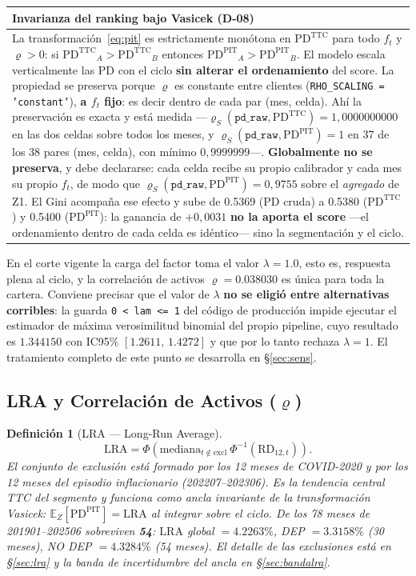 \documentclass[12pt, a4paper]{article}
\newcommand{\PDTTC}{\ensuremath{\mathrm{PD}^{\mathrm{TTC}}}}
\newcommand{\PDPIT}{\ensuremath{\mathrm{PD}^{\mathrm{PIT}}}}
\newcommand{\RD}{\ensuremath{\mathrm{RD}}}
\newcommand{\LRA}{\ensuremath{\mathrm{LRA}}}
\renewcommand{\rho}{\ensuremath{\varrho}}
\newcommand{\ft}{\ensuremath{f_t}}
\newtheorem{definicion}{Definición}[section]
\newenvironment{recuadro}[1]
{\begin{center}\begin{tabular}{|p{0.92\textwidth}|}
\hline
\rowcolor{grissuave}
\textbf{#1} \\ \hline
}
{\\ \hline \end{tabular}\end{center}}
\begin{document}
\begin{recuadro}{Invarianza del ranking bajo Vasicek (D-08)}
La transformación~\eqref{eq:pit} es estrictamente monótona en $\PDTTC$ para todo $\ft$ y
$\rho>0$: si $\PDTTC_A>\PDTTC_B$ entonces $\PDPIT_A>\PDPIT_B$. El modelo escala verticalmente
las PD con el ciclo \textbf{sin alterar el ordenamiento} del score. La propiedad se preserva
porque $\rho$ es constante entre clientes (\texttt{RHO\_SCALING = 'constant'}), \textbf{a $\ft$
fijo}: es decir dentro de cada par (mes, celda). Ahí la preservación es exacta y está medida
---$\rho_S(\texttt{pd\_raw},\PDTTC)=1{,}0000000000$ en las dos celdas sobre todos los meses, y
$\rho_S(\texttt{pd\_raw},\PDPIT)=1$ en 37 de los 38 pares (mes, celda), con mínimo $0{,}9999999$---.
\textbf{Globalmente no se preserva}, y debe declararse: cada celda recibe su propio calibrador y
cada mes su propio $\ft$, de modo que $\rho_S(\texttt{pd\_raw},\PDPIT)=0{,}9755$ sobre el
\emph{agregado} de Z1. El Gini acompaña ese efecto y sube de 0.5369 (PD cruda) a 0.5380 (\PDTTC) y
0.5400 (\PDPIT): la ganancia de $+0{,}0031$ \textbf{no la aporta el score} ---el ordenamiento
dentro de cada celda es idéntico--- sino la segmentación y el ciclo.
\end{recuadro}

\noindent En el corte vigente la carga del factor toma el valor $\lambda=1.0$, esto es, respuesta
plena al ciclo, y la correlación de activos $\rho=0.038030$ es única para toda la cartera. Conviene
precisar que el valor de $\lambda$ \textbf{no se eligió entre alternativas corribles}: la guarda
\texttt{0 < lam <= 1} del código de producción impide ejecutar el estimador de máxima verosimilitud
binomial del propio pipeline, cuyo resultado es $1.344150$ con IC95\% $[1.2611,\,1.4272]$ y que por
lo tanto rechaza $\lambda=1$. El tratamiento completo de este punto se desarrolla en
\S\ref{sec:sens}.

\subsection{LRA y Correlación de Activos ($\rho$)}
\begin{definicion}[LRA --- Long-Run Average]
\begin{equation}
  \LRA = \Phi\!\left(\mathrm{mediana}_{t\notin\text{excl}}\ \Phi^{-1}(\RD_{12,t})\right).
\end{equation}
El conjunto de exclusión está formado por los 12 meses de COVID-2020 y por los 12 meses del
episodio inflacionario (202207--202306). Es la tendencia central TTC del segmento y funciona como ancla invariante de la
transformación Vasicek: $\mathbb{E}_Z[\PDPIT]=\LRA$ al integrar sobre el ciclo. De los 78 meses de
201901--202506 sobreviven \textbf{54}: $\LRA$ global $=4.2263\%$, DEP $=3.3158\%$ (30 meses),
NO DEP $=4.3284\%$ (54 meses). El detalle de las exclusiones está en \S\ref{sec:lra} y la banda de
incertidumbre del ancla en \S\ref{sec:bandalra}.
\end{definicion}
\end{document}
